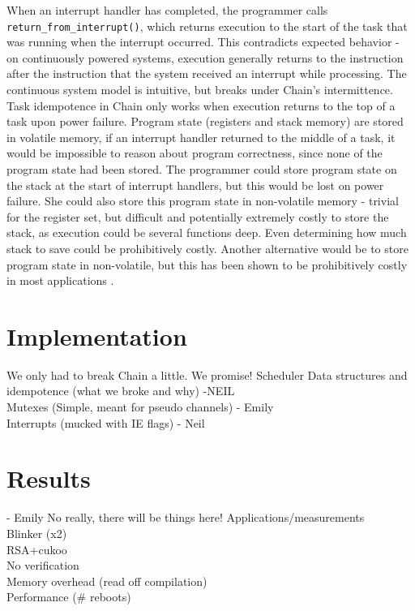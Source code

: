 \documentclass[11pt]{sensys-proc}
\newcommand{\chain}{Chain\xspace}
\begin{document}
When an interrupt handler has completed, the programmer calls
\texttt{return\_from\_interrupt()}, which returns execution to the start
of the task that was running when the interrupt occurred. This contradicts
expected behavior - on continuously powered systems, execution generally
returns to the instruction after the instruction that the system received an
interrupt while processing. The continuous system model is intuitive, but
breaks under \chain's intermittence. Task idempotence in \chain only works
when execution returns to the top of a
task upon power failure. Program state (registers and stack memory) are stored
in volatile memory, if an interrupt handler returned to the middle of a task,
it would be impossible to reason about program correctness, since none of the
program state had been stored. The programmer could store program state on the
stack at the start of interrupt handlers, but this would be lost on power
failure. She could also store this program state in non-volatile memory -
trivial for the register set, but difficult and potentially extremely costly to
store the stack, as execution could be several functions deep. Even determining
how much stack to save could be prohibitively costly. Another alternative would
be to store program state in non-volatile, but this has been shown to be
prohibitively costly in most applications \cite{Aware}.


\section{Implementation}
We only had to break \chain a little. We promise!
Scheduler Data structures and idempotence (what we broke and why) -NEIL\\
Mutexes (Simple, meant for pseudo channels) - Emily\\
Interrupts (mucked with IE flags) - Neil\\


\section{Results} - Emily
No really, there will be things here!
Applications/measurements\\
Blinker (x2)\\
RSA+cukoo\\
No verification\\
Memory overhead (read off compilation)\\
Performance (\# reboots)\\
\end{document}
